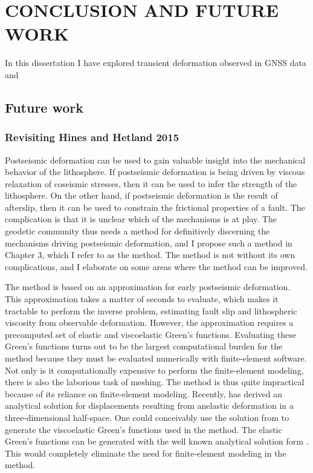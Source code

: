 \chapter{CONCLUSION AND FUTURE WORK}


In this dissertation I have explored transient deformation observed in GNSS data and   

\section{Future work}
\subsection{Revisiting Hines and Hetland 2015}
Postseismic deformation can be used to gain valuable insight into the mechanical behavior of the lithosphere. If postseismic deformation is being driven by viscous relaxation of coseismic stresses, then it can be used to infer the strength of the lithosphere. On the other hand, if postseismic deformation is the result of afterslip, then it can be used to constrain the frictional properties of a fault. The complication is that it is unclear which of the mechanisms is at play. The geodetic community thus needs a method for definitively discerning the mechanisms driving postseismic deformation, and I propose such a method in Chapter 3, which I refer to as the \citet{Hines2016} method. The \citet{Hines2016} method is not without its own complications, and I elaborate on some areas where the method can be improved.  

The \citet{Hines2016} method is based on an approximation for early postseismic deformation. This approximation takes a matter of seconds to evaluate, which makes it tractable to perform the inverse problem, estimating fault slip and lithospheric viscosity from observable deformation. However, the approximation requires a precomputed set of elastic and viscoelastic Green's functions. Evaluating these Green's functions turns out to be the largest computational burden for the \citet{Hines2016} method because they must be evaluated numerically with finite-element software. Not only is it computationally expensive to perform the finite-element modeling, there is also the laborious task of meshing. The \citet{Hines2016} method is thus quite impractical because of its reliance on finite-element modeling. Recently, \citet{Barbot2017} has derived an analytical solution for displacements resulting from anelastic deformation in a three-dimensional half-space. One could conceivably use the solution from \citet{Barbot2017} to generate the viscoelastic Green's functions used in the \citet{Hines2016} method. The elastic Green's functions can be generated with the well known analytical solution form \citet{Okada1992}. This would completely eliminate the need for finite-element modeling in the \citet{Hines2016} method.       
 
